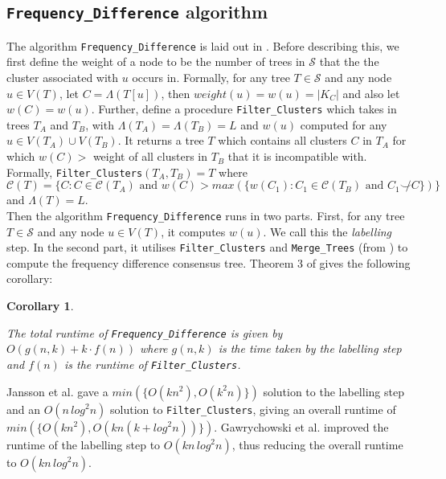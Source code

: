 \documentclass{article}
\newcommand{\compatible}{\smile}
\newcommand{\leafset}{\Lambda}
\newtheorem{freqdiffruntimecomponents}[incompatibility]{Corollary}
\begin{document}
    \subsection{\texttt{Frequency\_Difference} algorithm}
    The algorithm \texttt{Frequency\_Difference} is laid out in \cite{jansson2018algorithms}. Before describing this, we first define the weight of a node to be the number of trees in $\mathcal{S}$ that the the cluster associated with $u$ occurs in. Formally, for any tree $T \in \mathcal{S}$ and any node $u \in V(T)$, let $C = \leafset(T[u])$, then $weight(u) = w(u) = |K_C|$ and also let $w(C) = w(u)$. Further, define a procedure \texttt{Filter\_Clusters} which takes in trees $T_A$ and $T_B$, with $\leafset(T_A) = \leafset(T_B) = L$ and $w(u)$ computed for any $u \in V(T_A) \cup V(T_B)$. It returns a tree $T$ which contains all clusters $C$ in $T_A$ for which $w(C) > $ weight of all clusters in $T_B$ that it is incompatible with. Formally, \texttt{Filter\_Clusters}$(T_A, T_B) = T$ where $\mathcal{C}(T) = \{C : C \in \mathcal{C}(T_A) \text{ and } w(C) > max(\{w(C_1) : C_1 \in \mathcal{C}(T_B) \text{ and } C_1 \not\compatible C\})\}$ and $\leafset(T) = L$.\\

    Then the algorithm \texttt{Frequency\_Difference} runs in two parts. First, for any tree $T \in \mathcal{S}$ and any node $u \in V(T)$, it computes $w(u)$. We call this the \textit{labelling} step. In the second part, it utilises \texttt{Filter\_Clusters} and \texttt{Merge\_Trees} (from \cite{jansson2016improved}) to compute the frequency difference consensus tree. Theorem 3 of \cite{jansson2018algorithms} gives the following corollary:

    \begin{freqdiffruntimecomponents}
        \label{cor:freqdiffruntimecomponents}

        The total runtime of \texttt{Frequency\_Difference} is given by $O(g(n, k) + k \cdot f(n))$ where $g(n, k)$ is the time taken by the labelling step and $f(n)$ is the runtime of \texttt{Filter\_Clusters}.
    \end{freqdiffruntimecomponents}

    Jansson et al. \cite{jansson2018algorithms} gave a $min(\{O(kn^2), O(k^2n)\})$ solution to the labelling step and an $O(n\,log^2n)$ solution to \texttt{Filter\_Clusters}, giving an overall runtime of $min(\{O(kn^2), O(kn(k + log^2n))\})$. Gawrychowski et al. \cite{gawrychowski2017faster} improved the runtime of the labelling step to $O(kn\,log^2n)$, thus reducing the overall runtime to $O(kn\,log^2n)$.
\end{document}
